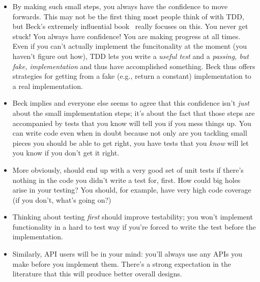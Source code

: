 \documentclass[sigplan,screen]{acmart}
\begin{document}
\begin{itemize}
  \item By making such small steps, you always have the confidence to
    move forwards.  This may not be the first thing most people think
    of with TDD, but Beck's extremely influential book~\cite{beck2002test} really focuses
    on this.  You never get stuck!  You always have confidence!  You
    are making progress at all times.  Even if you can't actually
    implement the funcitonality at the moment (you haven't figure out
    how), TDD lets you write a \emph{useful test} and a \emph{passing,
      but fake, implementation} and thus have accomplished something.
    Beck thus offers strategies for getting from a fake (e.g., return a
    constant) implementation to a real implementation.
    \item Beck implies and everyone else seems to agree that this
      confidence isn't \emph{just} about the small implementation steps; it's about
      the fact that those steps are accompanied by tests that you know
      will tell you if you mess things up.  You can write code even
      when in doubt because not only are you tackling small pieces you
      should be able to get right, you have tests that you \emph{know}
      will let you know if you don't get it right.
      \item More obviously, should end up with a very good set of unit
        tests if there's nothing in the code you didn't write a test
        for, first.  How could big holes arise in your testing?  You
        should, for example, have very high code coverage (if you
        don't, what's going on?)
        \item Thinking about testing \emph{first} should improve
          testability; you won't implement functionality in a hard to
          test way if you're forced to write the test before the
          implementation.
          \item Similarly, API users will be in your mind: you'll
            always use any APIs you make before you implement them.
            There's a strong expectation in the literature that this
            will produce better overall designs.
            \end{itemize}
\end{document}
